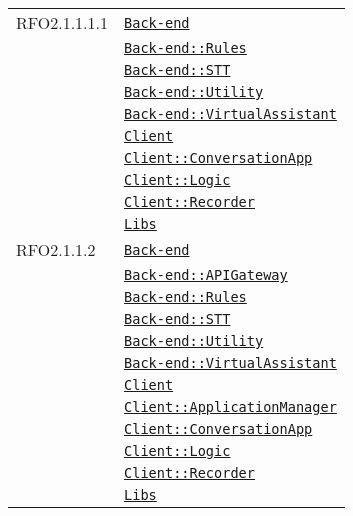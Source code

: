 \begin{longtable}{|>{\centering}m{3cm}|m{10cm}<{\centering}|}
RFO2.1.1.1.1 & \hyperref[Back-end]{\texttt{Back-end}}\\
& \hyperref[Back-end::Rules]{\texttt{Back-end::Rules}}\\
& \hyperref[Back-end::STT]{\texttt{Back-end::STT}}\\
& \hyperref[Back-end::Utility]{\texttt{Back-end::Utility}}\\
& \hyperref[Back-end::VirtualAssistant]{\texttt{Back-end::VirtualAssistant}}\\
& \hyperref[Client]{\texttt{Client}}\\
& \hyperref[Client::ConversationApp]{\texttt{Client::ConversationApp}}\\
& \hyperref[Client::Logic]{\texttt{Client::Logic}}\\
& \hyperref[Client::Recorder]{\texttt{Client::Recorder}}\\
& \hyperref[Libs]{\texttt{Libs}}\\ \hline

RFO2.1.1.2 & \hyperref[Back-end]{\texttt{Back-end}}\\
& \hyperref[Back-end::APIGateway]{\texttt{Back-end::APIGateway}}\\
& \hyperref[Back-end::Rules]{\texttt{Back-end::Rules}}\\
& \hyperref[Back-end::STT]{\texttt{Back-end::STT}}\\
& \hyperref[Back-end::Utility]{\texttt{Back-end::Utility}}\\
& \hyperref[Back-end::VirtualAssistant]{\texttt{Back-end::VirtualAssistant}}\\
& \hyperref[Client]{\texttt{Client}}\\
& \hyperref[Client::ApplicationManager]{\texttt{Client::ApplicationManager}}\\
& \hyperref[Client::ConversationApp]{\texttt{Client::ConversationApp}}\\
& \hyperref[Client::Logic]{\texttt{Client::Logic}}\\
& \hyperref[Client::Recorder]{\texttt{Client::Recorder}}\\
& \hyperref[Libs]{\texttt{Libs}}\\ \hline


\end{longtable}
